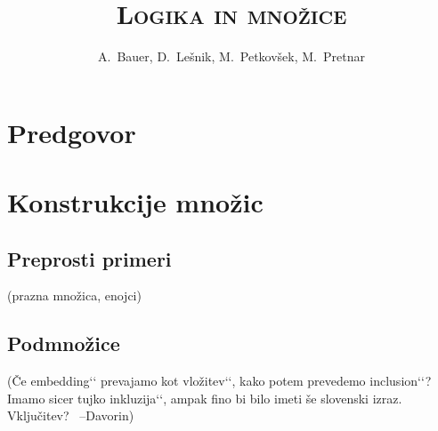 \documentclass[11pt,a4paper,twoside]{book}
\newcommand{\qt}[1]{{\quotedblbase}{#1}{‘‘}}  %
\newcommand{\davorin}[1]{{\small\textcolor{davorincolor}{(#1 \ \mbox{--Davorin})}}}
\newcommand{\note}[1]{{\small\textcolor{notecolor}{(#1)}}}
\begin{document}
   
        
        \title{\Huge \textbf{\textsc{Logika in množice}}}
        \author{A.~Bauer, D.~Lešnik, M.~Petkovšek, M.~Pretnar}
        
        \maketitle
   
   

   \chapter*{Predgovor}%


        
        
        \tableofcontents
        \listoftables
        
        
        
        
        
        
        
        
        \chapter{Konstrukcije množic}
                \section{Preprosti primeri}
                        \note{prazna množica, enojci}
                \section{Podmnožice}
                        \davorin{Če \qt{embedding} prevajamo kot \qt{vložitev}, kako potem prevedemo \qt{inclusion}? Imamo sicer tujko \qt{inkluzija}, ampak fino bi bilo imeti še slovenski izraz. Vključitev?}
\end{document}
